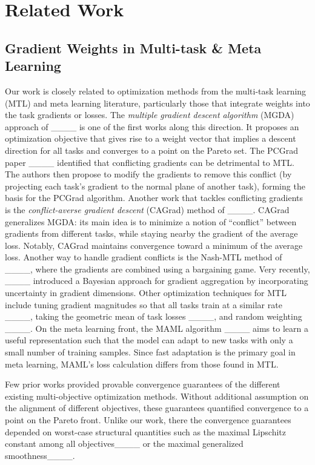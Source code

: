 \section{Related Work}
\subsection{Gradient Weights in Multi-task \& Meta Learning}
Our work is closely related to optimization methods from the multi-task learning (MTL) and meta learning literature, particularly those that integrate weights into the task gradients or losses. The \emph{multiple gradient descent algorithm} (MGDA) approach of ____ is one of the first works along this direction. It proposes an optimization objective that gives rise to a weight vector that implies a descent direction for all tasks and converges to a point on the Pareto set. 
The PCGrad paper ____ identified that conflicting gradients can be detrimental to MTL. The authors then propose to modify the gradients to remove this conflict (by projecting each task's gradient to the normal plane of another task), forming the basis for the PCGrad algorithm. Another work that tackles conflicting gradients is the \emph{conflict-averse gradient descent} (CAGrad) method of ____. CAGrad generalizes MGDA: its main idea is to minimize a notion of ``conflict'' between gradients from different tasks, while staying nearby the gradient of the average loss. Notably, CAGrad maintains convergence toward a minimum of the average loss. Another way to handle gradient conflicts is the Nash-MTL method of ____, where the gradients are combined using a bargaining game. Very recently, ____ introduced a Bayesian approach for gradient aggregation by incorporating uncertainty in gradient dimensions. Other optimization techniques for MTL include tuning gradient magnitudes so that all tasks train at a similar rate ____, taking the geometric mean of task losses ____, and random weighting ____. On the meta learning front, the MAML algorithm ____ aims to learn a useful representation such that the model can adapt to new tasks with only a small number of training samples. Since fast adaptation is the primary goal in meta learning, MAML's loss calculation differs from those found in MTL. 

Few prior works provided provable convergence guarantees of the different existing multi-objective optimization methods. Without additional assumption on the alignment of different objectives, these guarantees quantified convergence to a point on the Pareto front. Unlike our work, there the convergence guarantees depended on worst-case structural quantities such as the maximal Lipschitz constant among all objectives____ or the maximal generalized smoothness____.


